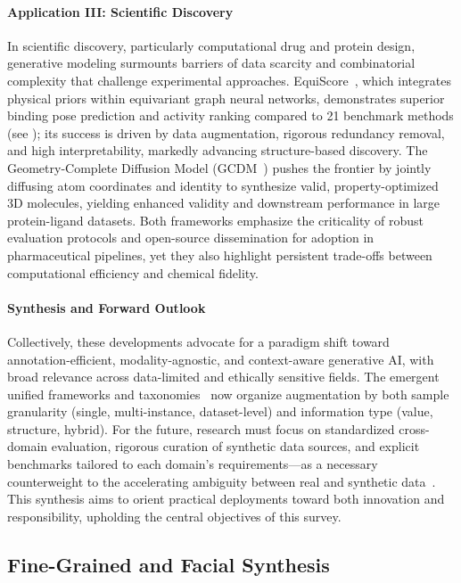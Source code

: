 \documentclass[sigconf]{acmart}
\begin{document}
\paragraph{Application III: Scientific Discovery}
In scientific discovery, particularly computational drug and protein design, generative modeling surmounts barriers of data scarcity and combinatorial complexity that challenge experimental approaches. EquiScore~\cite{ref59}, which integrates physical priors within equivariant graph neural networks, demonstrates superior binding pose prediction and activity ranking compared to 21 benchmark methods (see \cite{ref59}); its success is driven by data augmentation, rigorous redundancy removal, and high interpretability, markedly advancing structure-based discovery. The Geometry-Complete Diffusion Model (GCDM~\cite{ref74}) pushes the frontier by jointly diffusing atom coordinates and identity to synthesize valid, property-optimized 3D molecules, yielding enhanced validity and downstream performance in large protein-ligand datasets. Both frameworks emphasize the criticality of robust evaluation protocols and open-source dissemination for adoption in pharmaceutical pipelines, yet they also highlight persistent trade-offs between computational efficiency and chemical fidelity.

\paragraph{Synthesis and Forward Outlook}
Collectively, these developments advocate for a paradigm shift toward annotation-efficient, modality-agnostic, and context-aware generative AI, with broad relevance across data-limited and ethically sensitive fields. The emergent unified frameworks and taxonomies~\cite{ref61,ref62,ref64} now organize augmentation by both sample granularity (single, multi-instance, dataset-level) and information type (value, structure, hybrid). For the future, research must focus on standardized cross-domain evaluation, rigorous curation of synthetic data sources, and explicit benchmarks tailored to each domain’s requirements---as a necessary counterweight to the accelerating ambiguity between real and synthetic data~\cite{ref34,ref62,ref63,ref64,ref65,ref74,ref75,ref81,ref82,ref89,ref90}. This synthesis aims to orient practical deployments toward both innovation and responsibility, upholding the central objectives of this survey.

\subsection{Fine-Grained and Facial Synthesis}
\end{document}
